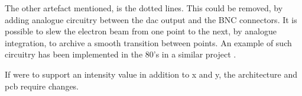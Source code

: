 The other artefact mentioned, is the dotted lines.
This could be removed, by adding analogue circuitry between the \gls{dac} output and the BNC connectors.
It is possible to slew the electron beam from one point to the next, by analogue integration, to archive a smooth transition between points.
An example of such circuitry has been implemented in the 80's in a similar project \cite{vector-graphic-crt}.


If \vthreek were to support an intensity value in addition to x and y, the architecture and \gls{pcb} require changes.
